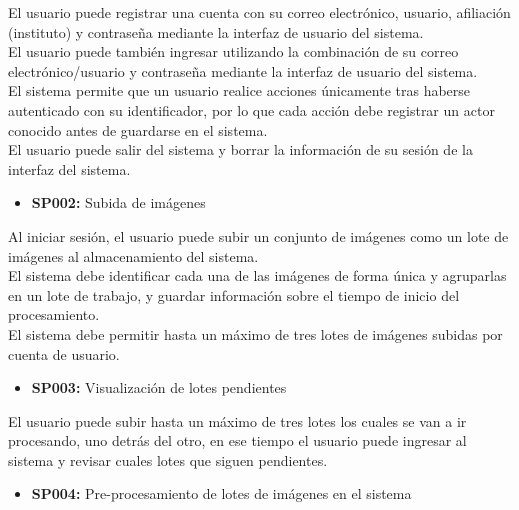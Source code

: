 \documentclass{scrreprt}
\begin{document}
El usuario puede registrar una cuenta con su correo electrónico, usuario, afiliación (instituto) y contraseña mediante la interfaz de usuario del sistema.\\

El usuario puede también ingresar utilizando la combinación de su correo electrónico/usuario y contraseña mediante la interfaz de usuario del sistema.\\

El sistema permite que un usuario realice acciones únicamente tras haberse autenticado con su identificador, por lo que cada acción debe registrar un actor conocido antes de guardarse en el sistema.\\

El usuario puede salir del sistema y borrar la información de su sesión de la interfaz del sistema.\\

\begin{itemize}
\item \textbf{SP002:} Subida de imágenes
\end{itemize}

Al iniciar sesión, el usuario puede subir un conjunto de imágenes como un lote de imágenes al almacenamiento del sistema.\\

El sistema debe identificar cada una de las imágenes de forma única y agruparlas en un lote de trabajo, y guardar información sobre el tiempo de inicio del procesamiento.\\

El sistema debe permitir hasta un máximo de tres lotes de imágenes subidas por cuenta de usuario.\\

\begin{itemize}
\item \textbf{SP003:} Visualización de lotes pendientes
\end{itemize}

El usuario puede subir hasta un máximo de tres lotes los cuales se van a ir procesando, uno detrás del otro, en ese tiempo el usuario puede ingresar al sistema y revisar cuales lotes que siguen pendientes.\\

\begin{itemize}
\item \textbf{SP004:} Pre-procesamiento de lotes de imágenes en el sistema
\end{itemize}
\end{document}
